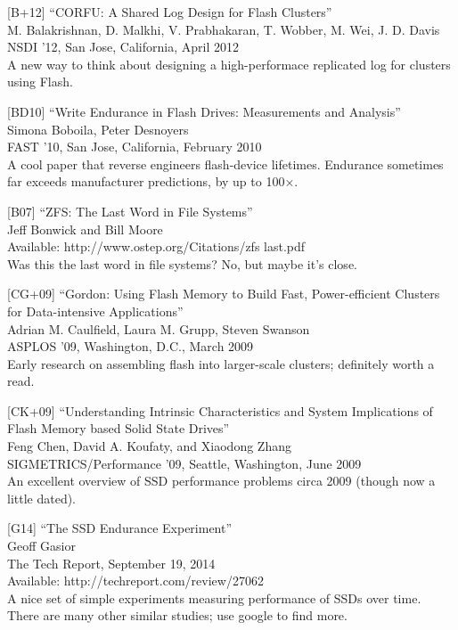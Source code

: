 {[}B+12{]} ``CORFU: A Shared Log Design for Flash Clusters''\\
M. Balakrishnan, D. Malkhi, V. Prabhakaran, T. Wobber, M. Wei, J. D.
Davis\\
NSDI '12, San Jose, California, April 2012\\
A new way to think about designing a high-performace replicated log for
clusters using Flash.

{[}BD10{]} ``Write Endurance in Flash Drives: Measurements and
Analysis''\\
Simona Boboila, Peter Desnoyers\\
FAST '10, San Jose, California, February 2010\\
A cool paper that reverse engineers flash-device lifetimes. Endurance
sometimes far exceeds manufacturer predictions, by up to 100×.

{[}B07{]} ``ZFS: The Last Word in File Systems''\\
Jeff Bonwick and Bill Moore\\
Available: http://www.ostep.org/Citations/zfs last.pdf\\
Was this the last word in file systems? No, but maybe it's close.

{[}CG+09{]} ``Gordon: Using Flash Memory to Build Fast, Power-efficient
Clusters for Data-intensive Applications''\\
Adrian M. Caulfield, Laura M. Grupp, Steven Swanson\\
ASPLOS '09, Washington, D.C., March 2009\\
Early research on assembling flash into larger-scale clusters;
definitely worth a read.

{[}CK+09{]} ``Understanding Intrinsic Characteristics and System
Implications of Flash Memory based Solid State Drives''\\
Feng Chen, David A. Koufaty, and Xiaodong Zhang\\
SIGMETRICS/Performance '09, Seattle, Washington, June 2009\\
An excellent overview of SSD performance problems circa 2009 (though now
a little dated).

{[}G14{]} ``The SSD Endurance Experiment''\\
Geoff Gasior\\
The Tech Report, September 19, 2014\\
Available: http://techreport.com/review/27062\\
A nice set of simple experiments measuring performance of SSDs over
time. There are many other similar studies; use google to find more.

